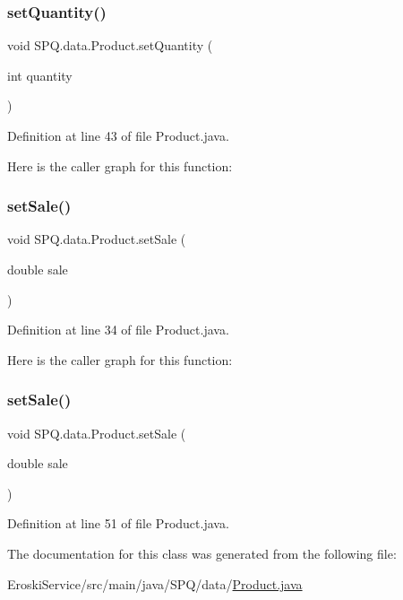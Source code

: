 \subsubsection{\texorpdfstring{set\+Quantity()}{setQuantity()}}
{\footnotesize\ttfamily void S\+P\+Q.\+data.\+Product.\+set\+Quantity (\begin{DoxyParamCaption}\item[{int}]{quantity }\end{DoxyParamCaption})}



Definition at line 43 of file Product.\+java.

Here is the caller graph for this function\+:
\mbox{\label{class_s_p_q_1_1data_1_1_product_ab7714f5e5a6f1b0a293ad7140c351c3c}} 
\subsubsection{\texorpdfstring{set\+Sale()}{setSale()}\hspace{0.1cm}{\footnotesize\ttfamily [1/2]}}
{\footnotesize\ttfamily void S\+P\+Q.\+data.\+Product.\+set\+Sale (\begin{DoxyParamCaption}\item[{double}]{sale }\end{DoxyParamCaption})}



Definition at line 34 of file Product.\+java.

Here is the caller graph for this function\+:
\mbox{\label{class_s_p_q_1_1data_1_1_product_ab7714f5e5a6f1b0a293ad7140c351c3c}} 
\subsubsection{\texorpdfstring{set\+Sale()}{setSale()}\hspace{0.1cm}{\footnotesize\ttfamily [2/2]}}
{\footnotesize\ttfamily void S\+P\+Q.\+data.\+Product.\+set\+Sale (\begin{DoxyParamCaption}\item[{double}]{sale }\end{DoxyParamCaption})}



Definition at line 51 of file Product.\+java.



The documentation for this class was generated from the following file\+:\begin{DoxyCompactItemize}
\item 
Eroski\+Service/src/main/java/\+S\+P\+Q/data/\mbox{\hyperlink{_eroski_service_2src_2main_2java_2_s_p_q_2data_2_product_8java}{Product.\+java}}\end{DoxyCompactItemize}

